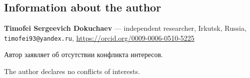 \documentclass[11pt,a4paper]{article}
\theoremstyle{plain}
\theoremstyle{remark}
\begin{document}
\begin{otherlanguage}{english}
\section*{Information about the author}
\noindent\textbf{Timofei Sergeevich Dokuchaev} ---
independent researcher, Irkutsk, Russia,
\texttt{timofei93@yandex.ru}, \url{https://orcid.org/0009-0006-0510-5225}
\end{otherlanguage}

\medskip
\noindent Автор заявляет об отсутствии конфликта интересов.

\begin{otherlanguage}{english}
\noindent The author declares no conflicts of interests.
\end{otherlanguage}
\end{document}

